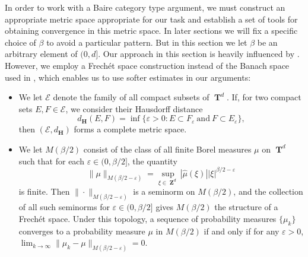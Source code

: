 \documentclass[12pt,reqno]{article}
\numberwithin{equation}{section}
\DeclareMathOperator{\ZZ}{\mathbf{Z}}
\DeclareMathOperator{\TT}{\mathbf{T}}
\numberwithin{theorem}{section}
\begin{document}
In order to work with a Baire category type argument, we must construct an appropriate metric space appropriate for our task and establish a set of tools for obtaining convergence in this metric space. In later sections we will fix a specific choice of $\beta$ to avoid a particular pattern. But in this section we let $\beta$ be an arbitrary element of $(0,d]$. Our approach in this section is heavily influenced by \cite{Korner2}. However, we employ a Frech\'{e}t space construction instead of the Banach space used in \cite{Korner2}, which enables us to use softer estimates in our arguments:
%
\begin{itemize}
    \item We let $\mathcal{E}$ denote the family of all compact subsets of $\TT^d$. If, for two compact sets $E,F \in \mathcal{E}$, we consider their Hausdorff distance
    \[ d_\mathbf{H}(E,F) = \inf \{ \varepsilon > 0 : E \subset F_\varepsilon\ \text{and}\ F \subset E_\varepsilon \}, \]
    then $(\mathcal{E},d_\mathbf{H})$ forms a complete metric space. %

    \item We let $M(\beta/2)$ consist of the class of all finite Borel measures $\mu$ on $\TT^d$ such that for each $\varepsilon \in (0,\beta/2]$, the quantity
    \[ \| \mu \|_{M(\beta/2 - \varepsilon)} = \sup_{\xi \in \ZZ^d} |\widehat{\mu}(\xi)| |\xi|^{\beta/2 - \varepsilon} \]
    is finite. Then $\| \cdot \|_{M(\beta/2 - \varepsilon)}$ is a seminorm on $M(\beta/2)$, and the collection of all such seminorms for $\varepsilon \in (0,\beta/2]$ gives $M(\beta/2)$ the structure of a Frech\'{e}t space. Under this topology, a sequence of probability measures $\{ \mu_k \}$ converges to a probability measure $\mu$ in $M(\beta/2)$ if and only if for any $\varepsilon > 0$, $\lim_{k \to \infty} \| \mu_k - \mu \|_{M(\beta/2 - \varepsilon)} = 0$.
\end{itemize}
\end{document}
